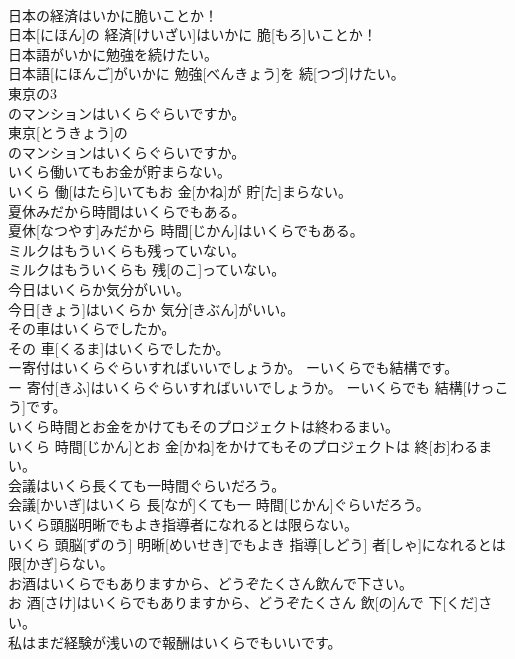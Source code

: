 \documentclass[8pt]{extreport}
\begin{document}
\begin{CJK}{UTF8}{min}
\\	日本の経済はいかに脆いことか！	
\\	日本[にほん]の 経済[けいざい]はいかに 脆[もろ]いことか！
\\	日本語がいかに勉強を続けたい。	
\\	日本語[にほんご]がいかに 勉強[べんきょう]を 続[つづ]けたい。
\\	東京の3
\\	のマンションはいくらぐらいですか。	
\\	東京[とうきょう]の 
\\	のマンションはいくらぐらいですか。
\\	いくら働いてもお金が貯まらない。	
\\	いくら 働[はたら]いてもお 金[かね]が 貯[た]まらない。
\\	夏休みだから時間はいくらでもある。	
\\	夏休[なつやす]みだから 時間[じかん]はいくらでもある。
\\	ミルクはもういくらも残っていない。	
\\	ミルクはもういくらも 残[のこ]っていない。
\\	今日はいくらか気分がいい。	
\\	今日[きょう]はいくらか 気分[きぶん]がいい。
\\	その車はいくらでしたか。	
\\	その 車[くるま]はいくらでしたか。
\\	ー寄付はいくらぐらいすればいいでしょうか。 ーいくらでも結構です。	
\\	ー 寄付[きふ]はいくらぐらいすればいいでしょうか。 ーいくらでも 結構[けっこう]です。
\\	いくら時間とお金をかけてもそのプロジェクトは終わるまい。	
\\	いくら 時間[じかん]とお 金[かね]をかけてもそのプロジェクトは 終[お]わるまい。
\\	会議はいくら長くても一時間ぐらいだろう。	
\\	会議[かいぎ]はいくら 長[なが]くても一 時間[じかん]ぐらいだろう。
\\	いくら頭脳明晰でもよき指導者になれるとは限らない。	
\\	いくら 頭脳[ずのう] 明晰[めいせき]でもよき 指導[しどう] 者[しゃ]になれるとは 限[かぎ]らない。
\\	お酒はいくらでもありますから、どうぞたくさん飲んで下さい。	
\\	お 酒[さけ]はいくらでもありますから、どうぞたくさん 飲[の]んで 下[くだ]さい。
\\	私はまだ経験が浅いので報酬はいくらでもいいです。	

\end{CJK}
\end{document}
